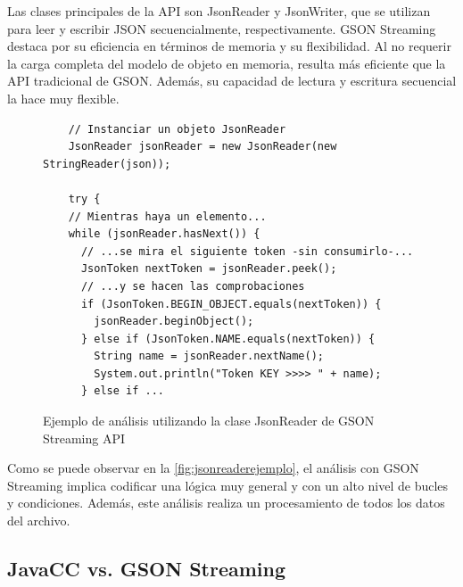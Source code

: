 Las clases principales de la API son JsonReader y JsonWriter, que se utilizan para leer y escribir JSON secuencialmente, respectivamente. GSON Streaming destaca por su eficiencia en términos de memoria y su flexibilidad. Al no requerir la carga completa del modelo de objeto en memoria, resulta más eficiente que la API tradicional de GSON. Además, su capacidad de lectura y escritura secuencial la hace muy flexible.


\begin{figure}[H]
  \centering
  \begin{lstlisting}
    // Instanciar un objeto JsonReader
    JsonReader jsonReader = new JsonReader(new StringReader(json));
    
    try {
    // Mientras haya un elemento...
    while (jsonReader.hasNext()) {
      // ...se mira el siguiente token -sin consumirlo-...
      JsonToken nextToken = jsonReader.peek();
      // ...y se hacen las comprobaciones
      if (JsonToken.BEGIN_OBJECT.equals(nextToken)) {
        jsonReader.beginObject();
      } else if (JsonToken.NAME.equals(nextToken)) {
        String name = jsonReader.nextName();
        System.out.println("Token KEY >>>> " + name);
      } else if ...
    \end{lstlisting}
  \caption{\label{fig:jsonreaderejemplo}Ejemplo de análisis utilizando la clase JsonReader de GSON Streaming API\cite{ejemplojsonreader}}
  \end{figure}


Como se puede observar en la \autoref{fig:jsonreaderejemplo}, el análisis con GSON Streaming implica codificar una lógica muy general y con un alto nivel de bucles y condiciones. Además, este análisis realiza un procesamiento de todos los datos del archivo.

\subsection{JavaCC vs. GSON Streaming}



